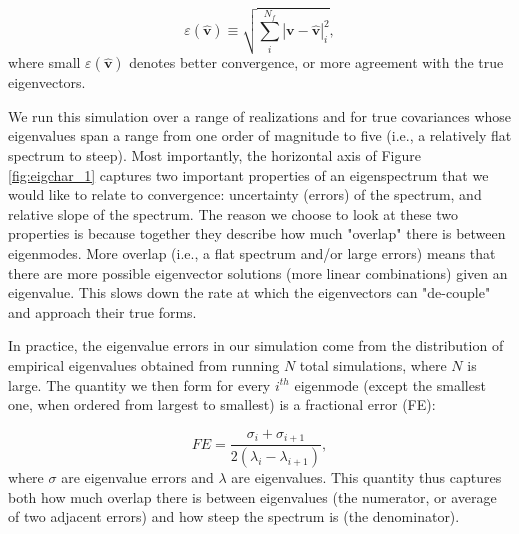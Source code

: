 \begin{equation}
\label{eq:converge_eig2}
\varepsilon (\widehat{\textbf{v}}) \equiv \sqrt{\sum_{i}^{N_{f}}|\textbf{v}-\widehat{\textbf{v}}|_{i}^2},
\end{equation}
where small $\varepsilon (\widehat{\textbf{v}})$ denotes better convergence, or more agreement with the true eigenvectors.

We run this simulation over a range of realizations and for true covariances whose eigenvalues span a range from one order of magnitude to five (i.e., a relatively flat spectrum to steep). Most importantly, the horizontal axis of Figure \ref{fig:eigchar_1} captures two important properties of an eigenspectrum that we would like to relate to convergence: uncertainty (errors) of the spectrum, and relative slope of the spectrum. The reason we choose to look at these two properties is because together they describe how much "overlap" there is between eigenmodes. More overlap (i.e., a flat spectrum and/or large errors) means that there are more possible eigenvector solutions (more linear combinations) given an eigenvalue. This slows down the rate at which the eigenvectors can "de-couple" and approach their true forms. 

In practice, the eigenvalue errors in our simulation come from the distribution of empirical eigenvalues obtained from running $N$ total simulations, where $N$ is large. The quantity we then form for every $i^{th}$ eigenmode (except the smallest one, when ordered from largest to smallest) is a fractional error (FE):

\begin{equation}
FE = \frac{\sigma_{i} + \sigma_{i+1}}{2(\lambda_{i} - \lambda_{i+1})},
\end{equation}
where $\sigma$ are eigenvalue errors and $\lambda$ are eigenvalues. This quantity thus captures both how much overlap there is between eigenvalues (the numerator, or average of two adjacent errors) and how steep the spectrum is (the denominator). 

